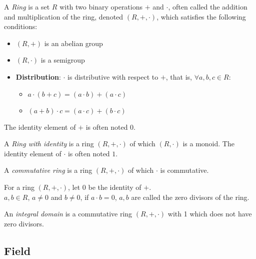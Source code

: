 \documentclass{report}
\begin{document}
			\begin{defn}[Ring] \label{def_ring}
				A \emph{Ring} is a set $R$ with two binary operations $+$ and $\cdot$, often called the addition and multiplication of the ring, denoted $(R,+,\cdot)$, which satisfies the following conditions:
				\begin{itemize}
					\item $(R,+)$ is an abelian group
					\item $(R,\cdot)$ is a semigroup
					\item \textbf{Distribution}: $\cdot$ is distributive with respect to $+$, that is, $\forall a,b,c \in R$:
					\begin{itemize}[label=-]
						\item $a \cdot (b + c)=(a \cdot b) + (a \cdot c)$
						\item $(a + b) \cdot c=(a \cdot c) + (b \cdot c)$
					\end{itemize}
				\end{itemize}
			The identity element of $+$ is often noted $0$.
			\end{defn}

		\begin{defn} \label{def_ring_with_1}
			A \emph{Ring with identity} is a ring $(R,+,\cdot)$ of which $(R,\cdot)$ is a monoid. The identity element of $\cdot$ is often noted $1$.
		\end{defn}

		\begin{defn} \label{def_commutative_ring}
			A \emph{commutative ring} is a ring $(R,+,\cdot)$ of which $\cdot$ is commutative.
		\end{defn}

		\begin{defn} \label{def_zero_divisor}
			For a ring $(R,+,\cdot)$, let $0$ be the identity of $+$.\\
			$a,b\in R$, $a \neq 0$ and $b \neq 0$, if $a \cdot b=0$, $a,b$ are called the zero divisors of the ring.
		\end{defn}

		\begin{defn} \label{def_integral_domain}
			An \emph{integral domain} is a commutative ring $(R,+,\cdot)$ with 1 which does not have zero divisors.
		\end{defn}

		\subsection{Field}
\end{document}
